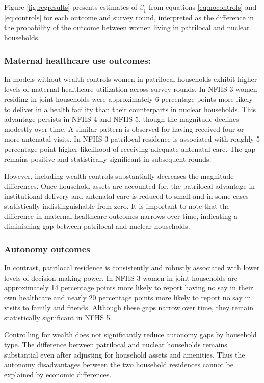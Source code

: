 \documentclass[12pt]{article}
\begin{document}
Figure \ref{fig:regresults} presents estimates of $\beta_1$ from equations \ref{eq:nocontrols} and \ref{eq:controls} for each outcome and survey round, interpreted as the difference in the probability of the outcome between women living in patrilocal and nuclear households.

\subsubsection{ Maternal healthcare use outcomes:}

In models without wealth controls women in patrilocal households exhibit higher levels of maternal healthcare utilization across survey rounds. In NFHS 3 women residing in joint households were approximately 6 percentage points more likely to deliver in a health facility than their counterparts in nuclear households. This advantage persists in NFHS 4 and NFHS 5, though the magnitude declines modestly over time. A similar pattern is observed for having received four or more antenatal visits. In NFHS 3 patrilocal residence is associated with roughly 5 percentage point higher likelihood of receiving adequate antenatal care. The gap remains positive and statistically significant in subsequent rounds.

However, including wealth controls substantially decreases the magnitude differences. Once household assets are accounted for, the patrilocal advantage in institutional delivery and antenatal care is reduced to small and in some cases statistically indistinguishable from zero. It is important to note that the difference in maternal healthcare outcomes narrows over time, indicating a diminishing gap between patrilocal and nuclear households. 

\subsubsection{Autonomy outcomes}

In contrast, patrilocal residence is consistently and robustly associated with lower levels of decision making power. In NFHS 3 women in joint households are approximately 14 percentage points more likely to report having no say in their own healthcare and nearly 20 percentage points more likely to report no say in visits to family and friends. Although these gaps narrow over time, they remain statistically significant in NFHS 5.

Controlling for wealth does not significantly reduce  autonomy gaps by household type. The difference between patrilocal and nuclear households remains substantial even after adjusting for household assets and amenities. Thus the autonomy disadvantages between the two household residences cannot be explained by economic differences. 
\end{document}
